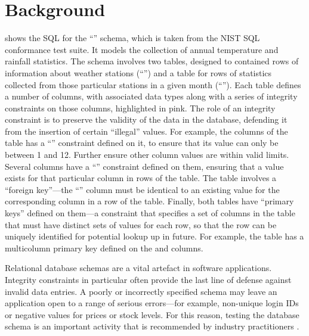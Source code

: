 
\section{Background}
\label{sec:background}



 shows the SQL for the ``\NistWeather'' schema, which is taken from the NIST SQL conformance test suite. It models the collection of annual temperature and rainfall statistics. The schema involves two tables, designed to contained rows of information about weather stations (``'') and a table for rows of statistics collected from those particular stations in a given month (``''). Each table defines a number of columns, with associated data types along with a series of integrity constraints on those columns, highlighted in pink. The role of an integrity constraint is to preserve the validity of the data in the database, defending it from the insertion of certain ``illegal'' values. For example, the  columns of the  table has a ``\CHECK'' constraint defined on it, to ensure that its value can only be between 1 and 12. Further \CCs ensure other column values are within valid limits. Several columns have a ``\NOTNULL'' constraint defined on them, ensuring that a value exists for that particular column in rows of the table. The  table involves a ``foreign key''---the ``'' column must be identical to an existing value for the corresponding  column in a row of the  table. Finally, both tables have ``primary keys'' defined on them---a constraint that specifies a set of columns in the table that must have distinct sets of values for each row, so that the row can be uniquely identified for potential lookup up in future. For example, the  table has a multicolumn primary key defined on the  and  columns. 

Relational database schemas are a vital artefact in software applications. Integrity constraints in particular often provide the last line of defense against invalid data entries. A poorly or incorrectly specified schema may leave an application open to a range of serious errors---for example, non-unique login IDs or negative values for prices or stock levels. For this reason, testing the database schema is an important activity that is recommended by industry practitioners \cite{DzoneDatabaseTesting}. 

